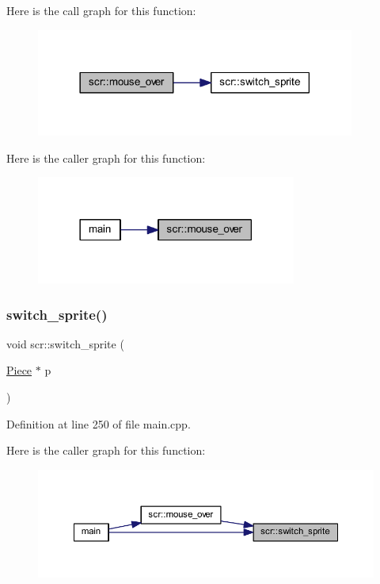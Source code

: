 Here is the call graph for this function\+:
\nopagebreak
\begin{figure}[H]
\begin{center}
\leavevmode
\includegraphics[width=297pt]{namespacescr_a10f589a004aed2b681476e3cf0c02bfb_cgraph}
\end{center}
\end{figure}
Here is the caller graph for this function\+:
\nopagebreak
\begin{figure}[H]
\begin{center}
\leavevmode
\includegraphics[width=242pt]{namespacescr_a10f589a004aed2b681476e3cf0c02bfb_icgraph}
\end{center}
\end{figure}
\mbox{\label{namespacescr_a7b91c934af8545eebc19222fe7a756ab}} 
\subsubsection{\texorpdfstring{switch\_sprite()}{switch\_sprite()}}
{\footnotesize\ttfamily void scr\+::switch\+\_\+sprite (\begin{DoxyParamCaption}\item[{\mbox{\hyperlink{class_piece}{Piece}} $\ast$}]{p }\end{DoxyParamCaption})\hspace{0.3cm}{\ttfamily [inline]}}



Definition at line 250 of file main.\+cpp.

Here is the caller graph for this function\+:
\nopagebreak
\begin{figure}[H]
\begin{center}
\leavevmode
\includegraphics[width=350pt]{namespacescr_a7b91c934af8545eebc19222fe7a756ab_icgraph}
\end{center}
\end{figure}
